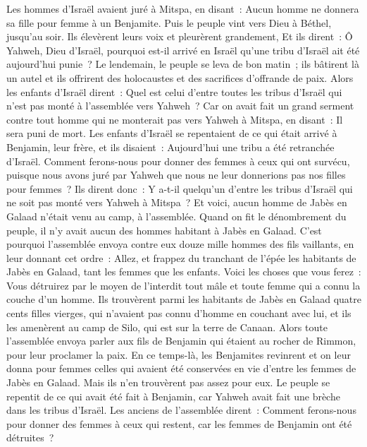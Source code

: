 \begin{multicols}{2}
\VerseOne{}Les hommes d'Israël avaient juré à Mitspa, en disant~: Aucun homme ne donnera sa fille pour femme à un Benjamite.
Puis le peuple vint vers Dieu à Béthel, jusqu'au soir. Ils élevèrent leurs voix et pleurèrent grandement,
Et ils dirent~: Ô Yahweh, Dieu d'Israël, pourquoi est-il arrivé en Israël qu'une tribu d'Israël ait été aujourd'hui punie~?
Le lendemain, le peuple se leva de bon matin~; ils bâtirent là un autel et ils offrirent des holocaustes et des sacrifices d'offrande de paix.
Alors les enfants d'Israël dirent~: Quel est celui d'entre toutes les tribus d'Israël qui n'est pas monté à l'assemblée vers Yahweh~? Car on avait fait un grand serment contre tout homme qui ne monterait pas vers Yahweh à Mitspa, en disant~: Il sera puni de mort.
Les enfants d'Israël se repentaient de ce qui était arrivé à Benjamin, leur frère, et ils disaient~: Aujourd'hui une tribu a été retranchée d'Israël.
Comment ferons-nous pour donner des femmes à ceux qui ont survécu, puisque nous avons juré par Yahweh que nous ne leur donnerions pas nos filles pour femmes~?
Ils dirent donc~: Y a-t-il quelqu'un d'entre les tribus d'Israël qui ne soit pas monté vers Yahweh à Mitspa~? Et voici, aucun homme de Jabès en Galaad n'était venu au camp, à l'assemblée.
Quand on fit le dénombrement du peuple, il n'y avait aucun des hommes habitant à Jabès en Galaad.
C'est pourquoi l'assemblée envoya contre eux douze mille hommes des fils vaillants, en leur donnant cet ordre~: Allez, et frappez du tranchant de l'épée les habitants de Jabès en Galaad, tant les femmes que les enfants.
Voici les choses que vous ferez~: Vous détruirez par le moyen de l'interdit tout mâle et toute femme qui a connu la couche d'un homme.
Ils trouvèrent parmi les habitants de Jabès en Galaad quatre cents filles vierges, qui n'avaient pas connu d'homme en couchant avec lui, et ils les amenèrent au camp de Silo, qui est sur la terre de Canaan.
Alors toute l'assemblée envoya parler aux fils de Benjamin qui étaient au rocher de Rimmon, pour leur proclamer la paix.
En ce temps-là, les Benjamites revinrent et on leur donna pour femmes celles qui avaient été conservées en vie d'entre les femmes de Jabès en Galaad. Mais ils n'en trouvèrent pas assez pour eux.
Le peuple se repentit de ce qui avait été fait à Benjamin, car Yahweh avait fait une brèche dans les tribus d'Israël.
Les anciens de l'assemblée dirent~: Comment ferons-nous pour donner des femmes à ceux qui restent, car les femmes de Benjamin ont été détruites~?

\end{multicols}
